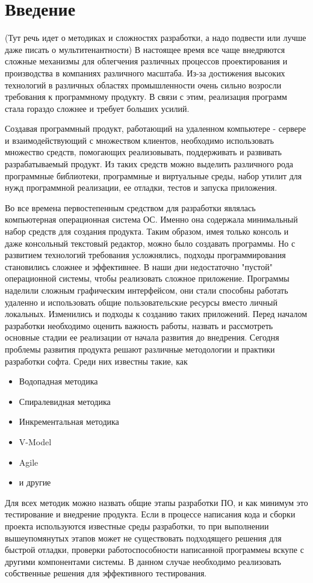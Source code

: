 \section{Введение}
(Тут речь идет о методиках и сложностях разработки, а надо подвести или лучше даже писать о мультитенантности)
В настоящее время все чаще внедряются сложные механизмы для облегчения различных процессов проектирования и производства в компаниях различного масштаба. Из-за достижения высоких технологий в различных областях промышленности очень сильно возросли требования к программному продукту. В связи с этим, реализация программ стала гораздо сложнее и требует больших усилий. 

Создавая программный продукт, работающий на удаленном компьютере - сервере и взаимодействующий с множеством клиентов, необходимо использовать множество средств, помогающих реализовывать, поддерживать и развивать разрабатываемый продукт. Из таких средств можно выделить различного рода программные библиотеки, программные и виртуальные среды, набор утилит для нужд программной реализации, ее отладки, тестов и запуска приложения.

Во все времена первостепенным средством для разработки являлась компьютерная операционная система ОС. Именно она содержала минимальный набор средств для создания продукта. Таким образом, имея только консоль и даже консольный текстовый редактор, можно было создавать программы. 
Но с развитием технологий требования усложнялись, подходы программирования становились сложнее и эффективнее. В наши дни недостаточно "пустой" операционной системы, чтобы реализовать сложное приложение. Программы наделили сложным графическим интерфейсом, они стали способны работать удаленно и использовать общие пользовательские ресурсы вместо личный локальных.
Изменились и подходы к созданию таких приложений. Перед началом разработки необходимо оценить важность работы, назвать и рассмотреть основные стадии ее реализации от начала развития до внедрения. Сегодня проблемы развития продукта решают различные методологии и практики разработки софта. 
Среди них известны такие, как 
\begin{itemize}
\item Водопадная методика
\item Спиралевидная методика
\item Инкрементальная методика
\item V-Model 
\item Agile
\item и другие
\end{itemize}
Для всех методик можно назвать общие этапы разработки ПО, и как минимум это тестирование и внедрение продукта. Если в процессе написания кода и сборки проекта используются известные среды разработки, то при выполнении вышеупомянутых этапов может не существовать подходящего решения для быстрой отладки, проверки работоспособности написанной программеы вскупе с другими компонентами системы. В данном случае необходимо реализовать собственные решения для эффективного тестирования.